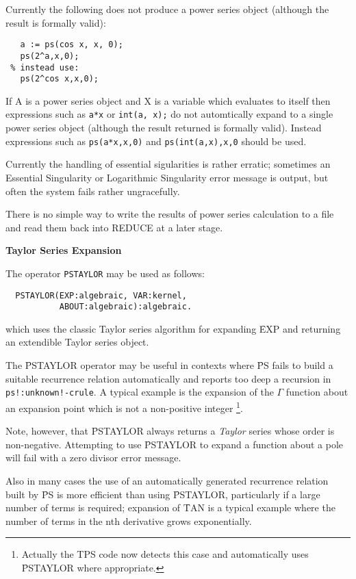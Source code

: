 Currently the following does not produce a power series object (although the
result is formally valid):
\begin{verbatim}
   a := ps(cos x, x, 0);
   ps(2^a,x,0);
 % instead use:
   ps(2^cos x,x,0);
\end{verbatim}

If A is a power series object and X is a variable
which evaluates to itself then expressions such as \texttt{a*x} or
\texttt{int(a, x);}  do not automtically expand to a single power series object
(although the result returned is formally valid).  Instead expressions such as
 \texttt{ps(a*x,x,0)} and \texttt{ps(int(a,x),x,0} should be used.

Currently the handling of essential sigularities is rather erratic; sometimes
an Essential Singularity or Logarithmic Singularity error message is output,
but often the system fails rather ungracefully.

There is no simple way to write the results of power series
calculation to a file and read them back into REDUCE at a later
stage.

\textbf{Taylor Series Expansion}

The operator \texttt{PSTAYLOR} may be used as follows:
\hypertarget{operator:PSTAYLOR}{}
\begin{verbatim}
  PSTAYLOR(EXP:algebraic, VAR:kernel, 
           ABOUT:algebraic):algebraic.
\end{verbatim}

which uses the classic Taylor series algorithm for expanding \f{EXP} and
returning an extendible Taylor series object.

The \f{PSTAYLOR} operator may be useful in contexts where \f{PS} fails to build
a suitable recurrence relation automatically and reports too deep a recursion in
\texttt{ps!:unknown!-crule}. A typical example is the expansion of the $\Gamma$
function about an expansion point which is not a non-positive integer
\footnote{Actually the TPS code now detects this case and automatically uses
\f{PSTAYLOR} where appropriate.}.

Note, however, that \f{PSTAYLOR} always returns a \emph{Taylor} series whose
order is non-negative.  Attempting to use \f{PSTAYLOR} to expand a function
about a pole will fail with a zero divisor error message.

Also in many cases the use of an automatically generated recurrence relation
built by \f{PS} is more  efficient than using \f{PSTAYLOR}, particularly if a
large number of terms is required; expansion of \f{TAN} is a typical example
where the number of terms in the nth derivative grows exponentially.


